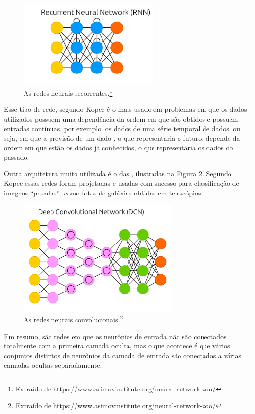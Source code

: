 \begin{figure}[htb]
\centering
\includegraphics[width=7cm]{figuras/estrutura_r}
\caption{As redes neurais recorrentes.\footnote{Extraído de \url{https://www.asimovinstitute.org/neural-network-zoo/}}}
\label{fig:estrutura_r}
\end{figure}

Esse tipo de rede, segundo Kopec \citep{classic} é o mais usado em problemas em que os dados utilizados possuem uma dependência da ordem em que são obtidos e possuem entradas contínuas, por exemplo, os dados de uma série temporal de dados, ou seja, em que a previsão de um dado , o que representaria o futuro, depende da ordem em que estão os dados já conhecidos, o que representaria os dados do passado.

Outra arquitetura muito utilizada é o das , ilustradas na Figura \ref{fig:estrutura_c}.  Segundo Kopec \citep{classic} essas redes foram projetadas e usadas com sucesso para classificação de imagens ``pesadas'', como fotos de galáxias obtidas em telescópios.

\begin{figure}[htb]
\centering
\includegraphics[width=8cm]{figuras/estrutura_c}
\caption{As redes neurais convolucionais.\footnote{Extraído de \url{https://www.asimovinstitute.org/neural-network-zoo/}}}
\label{fig:estrutura_c}
\end{figure}

Em resumo, são redes em que os neurônios de entrada não são conectados totalmente com a primeira camada oculta, mas o que acontece é que vários conjuntos distintos de neurônios da camada de entrada são conectados a várias camadas ocultas separadamente.

